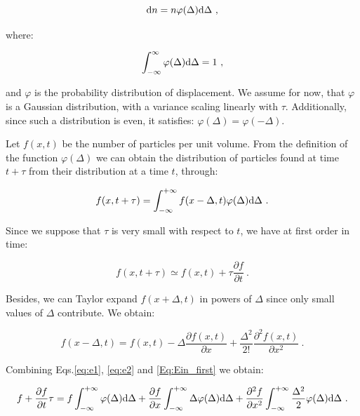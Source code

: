 \begin{equation}
	\textnormal{d}n = n\varphi(\Delta)\textnormal{d}\Delta ~,
\end{equation}

where:

\begin{equation}
	\int_{-\infty} ^{\infty} \varphi (\Delta)\textnormal{d} \Delta = 1 ~,
	\label{Eq:ein_def_phi}
\end{equation}

and $\varphi$ is the probability distribution of displacement. We assume for now, that  $\varphi$ is a Gaussian distribution, with a variance scaling linearly with $\tau$. Additionally, since such a distribution is even, it satisfies: $\varphi (\Delta) = \varphi (-\Delta)$.

Let $f(x,t)$ be the number of particles per unit volume. From the definition of the function $\varphi(\Delta)$ we can obtain the distribution of particles found at time $ t + \tau$ from their distribution at a time $t$, through:

\begin{equation}
	f(x, t+\tau) = \int_{-\infty} ^{ +\infty} f(x-\Delta, t) \varphi (\Delta) \textnormal{d}\Delta ~.
	\label{Eq:Ein_first}
\end{equation}

Since we suppose that $\tau$ is very small with respect to  $t$, we have at first order in time:

\begin{equation}
	f(x, t+\tau) \simeq f(x,t) + \tau \frac{\partial f}{\partial t} ~.
	\label{eq:e1}
\end{equation}

Besides, we can Taylor expand $f(x+\Delta, t)$ in powers of $\Delta$ since only small values of $\Delta$ contribute. We obtain:

\begin{equation}
	f(x - \Delta, t) = f(x,t) - \Delta \frac{\partial f(x,t)}{\partial x} + \frac{\Delta ^2}{2!} \frac{\partial ^2 f(x,t)}{\partial x^2} ~.
	\label{eq:e2}
\end{equation}

Combining Eqs.\ref{eq:e1}, \ref{eq:e2} and \ref{Eq:Ein_first} we obtain:

\begin{equation}
	f + \frac{\partial f}{\partial t} \tau = f \int_{-\infty}^{+\infty} \varphi(\Delta)\textnormal{d} \Delta + \frac{\partial f}{\partial x} \int_{-\infty}^{+\infty} \Delta \varphi (\Delta)\textnormal{d} \Delta + \frac{\partial ^2 f}{\partial x^2} \int_{-\infty}^{+\infty} \frac{\Delta ^2}{2} \varphi(\Delta)\textnormal{d}\Delta ~.
	\label{Eq:ein_expended}
\end{equation}

